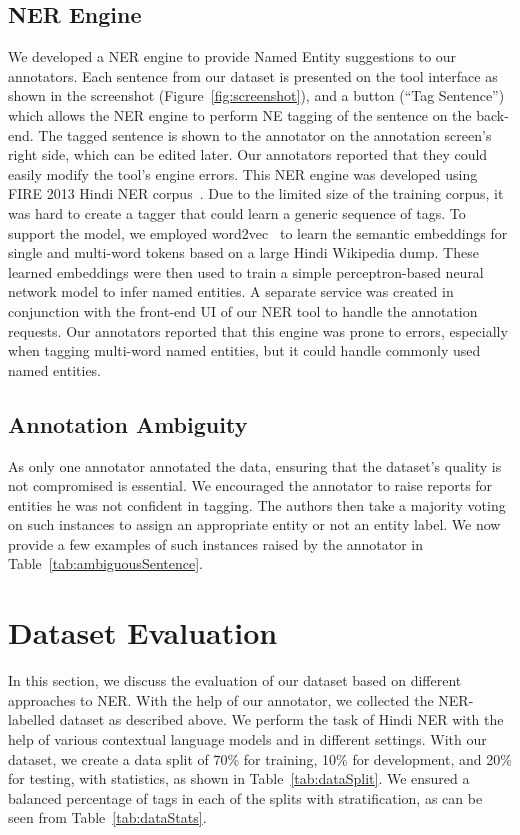 \documentclass[10pt, a4paper]{article}
\begin{document}
\subsection{NER Engine}

We developed a NER engine to provide Named Entity suggestions to our annotators. Each sentence from our dataset is presented on the tool interface as shown in the screenshot (Figure~\ref{fig:screenshot}), and a button (``Tag Sentence'') which allows the NER engine to perform NE tagging of the sentence on the back-end. The tagged sentence is shown to the annotator on the annotation screen's right side, which can be edited later. Our annotators reported that they could easily modify the tool's engine errors. This NER engine was developed using FIRE 2013 Hindi NER corpus~\cite{FIRE2013}. Due to the limited size of the training corpus, it was hard to create a tagger that could learn a generic sequence of tags. To support the model, we employed word2vec~\cite{word2vec} to learn the semantic embeddings for single and multi-word tokens based on a large Hindi Wikipedia dump. These learned embeddings were then used to train a simple perceptron-based neural network model to infer named entities. A separate service was created in conjunction with the front-end UI of our NER tool to handle the annotation requests. Our annotators reported that this engine was prone to errors, especially when tagging multi-word named entities, but it could handle commonly used named entities. 

\subsection{Annotation Ambiguity}
As only one annotator annotated the data, ensuring that the dataset's quality is not compromised is essential. We encouraged the annotator to raise reports for entities he was not confident in tagging. The authors then take a majority voting on such instances to assign an appropriate entity or not an entity label. We now provide a few examples of such instances raised by the annotator in Table~\ref{tab:ambiguousSentence}.





 \section{Dataset Evaluation}

In this section, we discuss the evaluation of our dataset based on different approaches to NER. With the help of our annotator, we collected the NER-labelled dataset as described above. We perform the task of Hindi NER with the help of various contextual language models and in different settings. With our dataset, we create a data split of 70\% for training, 10\% for development, and 20\% for testing, with statistics, as shown in Table~\ref{tab:dataSplit}. We ensured a balanced percentage of tags in each of the splits with stratification, as can be seen from Table~\ref{tab:dataStats}. 
\end{document}

